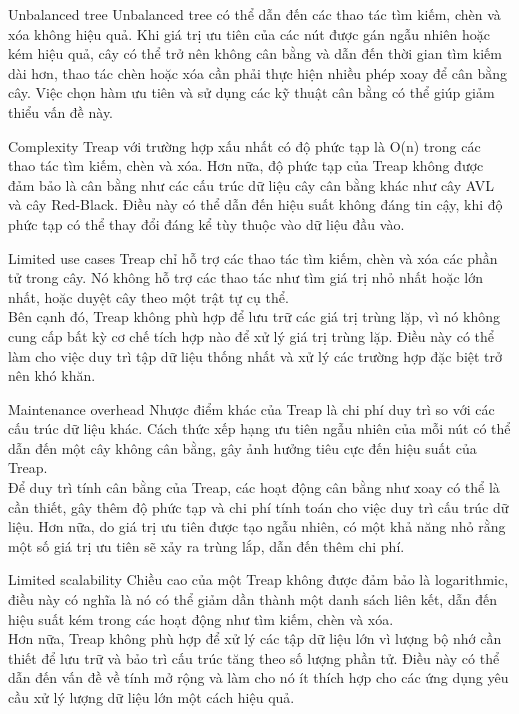\documentclass[12pt]{amsart}
\begin{document}
\begin{section}{Unbalanced tree}
    Unbalanced tree có thể dẫn đến các thao tác tìm kiếm, chèn và xóa không hiệu quả. Khi giá trị ưu tiên của các nút được gán ngẫu nhiên hoặc kém hiệu quả, cây có thể trở nên không cân bằng và dẫn đến thời gian tìm kiếm dài hơn, thao tác chèn hoặc xóa cần phải thực hiện nhiều phép xoay để cân bằng cây. Việc chọn hàm ưu tiên và sử dụng các kỹ thuật cân bằng có thể giúp giảm thiểu vấn đề này.
\end{section}
\begin{section}{Complexity}
    Treap với trường hợp xấu nhất có độ phức tạp là O(n) trong các thao tác tìm kiếm, chèn và xóa. Hơn nữa, độ phức tạp của Treap không được đảm bảo là cân bằng như các cấu trúc dữ liệu cây cân bằng khác như cây AVL và cây Red-Black. Điều này có thể dẫn đến hiệu suất không đáng tin cậy, khi độ phức tạp có thể thay đổi đáng kể tùy thuộc vào dữ liệu đầu vào.
\end{section}
\begin{section}{Limited use cases}
    Treap chỉ hỗ trợ các thao tác tìm kiếm, chèn và xóa các phần tử trong cây. Nó không hỗ trợ các thao tác như tìm giá trị nhỏ nhất hoặc lớn nhất, hoặc duyệt cây theo một trật tự cụ thể. \\

    Bên cạnh đó, Treap không phù hợp để lưu trữ các giá trị trùng lặp, vì nó không cung cấp bất kỳ cơ chế tích hợp nào để xử lý giá trị trùng lặp. Điều này có thể làm cho việc duy trì tập dữ liệu thống nhất và xử lý các trường hợp đặc biệt trở nên khó khăn.
\end{section}
\begin{section}{Maintenance overhead}
    Nhược điểm khác của Treap là chi phí duy trì so với các cấu trúc dữ liệu khác. Cách thức xếp hạng ưu tiên ngẫu nhiên của mỗi nút có thể dẫn đến một cây không cân bằng, gây ảnh hưởng tiêu cực đến hiệu suất của Treap. \\

    Để duy trì tính cân bằng của Treap, các hoạt động cân bằng như xoay có thể là cần thiết, gây thêm độ phức tạp và chi phí tính toán cho việc duy trì cấu trúc dữ liệu. Hơn nữa, do giá trị ưu tiên được tạo ngẫu nhiên, có một khả năng nhỏ rằng một số giá trị ưu tiên sẽ xảy ra trùng lắp, dẫn đến thêm chi phí.
\end{section}
\begin{section}{Limited scalability}
    Chiều cao của một Treap không được đảm bảo là logarithmic, điều này có nghĩa là nó có thể giảm dần thành một danh sách liên kết, dẫn đến hiệu suất kém trong các hoạt động như tìm kiếm, chèn và xóa. \\

    Hơn nữa, Treap không phù hợp để xử lý các tập dữ liệu lớn vì lượng bộ nhớ cần thiết để lưu trữ và bảo trì cấu trúc tăng theo số lượng phần tử. Điều này có thể dẫn đến vấn đề về tính mở rộng và làm cho nó ít thích hợp cho các ứng dụng yêu cầu xử lý lượng dữ liệu lớn một cách hiệu quả.

\end{section}
\end{document}
